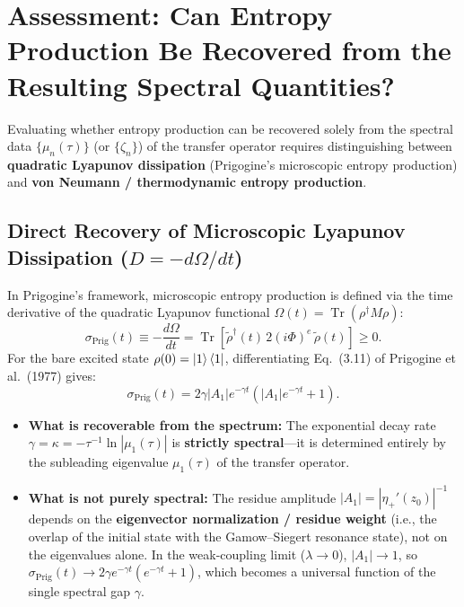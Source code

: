\documentclass[11pt,a4paper]{article}
\begin{document}
\section{Assessment: Can Entropy Production Be Recovered from the Resulting Spectral Quantities?}

Evaluating whether entropy production can be recovered solely from the spectral data $\{\mu_n(\tau)\}$ (or $\{\zeta_n\}$) of the transfer operator requires distinguishing between \textbf{quadratic Lyapunov dissipation} (Prigogine's microscopic entropy production) and \textbf{von Neumann / thermodynamic entropy production}.

\subsection{Direct Recovery of Microscopic Lyapunov Dissipation ($D = -d\Omega/dt$)}
In Prigogine's framework, microscopic entropy production is defined via the time derivative of the quadratic Lyapunov functional $\Omega(t) = \operatorname{Tr}(\rho^\dagger M \rho)$:
\begin{equation}
\sigma_{\mathrm{Prig}}(t) \equiv -\frac{d\Omega}{dt} = \operatorname{Tr}\left[\tilde{\rho}^\dagger(t) \, 2(i\Phi)^e \, \tilde{\rho}(t)\right] \ge 0.
\end{equation}
For the bare excited state $\rho(0) = \ket{1}\bra{1}$, differentiating Eq.~(3.11) of Prigogine et al.\ (1977) gives:
\begin{equation}
\sigma_{\mathrm{Prig}}(t) = 2\gamma |A_1| e^{-\gamma t} \left( |A_1| e^{-\gamma t} + 1 \right).
\end{equation}
\begin{itemize}
    \item \textbf{What is recoverable from the spectrum:} The exponential decay rate $\gamma = \kappa = -\tau^{-1}\ln|\mu_1(\tau)|$ is \textbf{strictly spectral}---it is determined entirely by the subleading eigenvalue $\mu_1(\tau)$ of the transfer operator.
    \item \textbf{What is not purely spectral:} The residue amplitude $|A_1| = |\eta_+'(z_0)|^{-1}$ depends on the \textbf{eigenvector normalization / residue weight} (i.e., the overlap of the initial state with the Gamow--Siegert resonance state), not on the eigenvalues alone. In the weak-coupling limit ($\lambda \to 0$), $|A_1| \to 1$, so $\sigma_{\mathrm{Prig}}(t) \to 2\gamma e^{-\gamma t}(e^{-\gamma t} + 1)$, which becomes a universal function of the single spectral gap $\gamma$.
\end{itemize}
\end{document}
